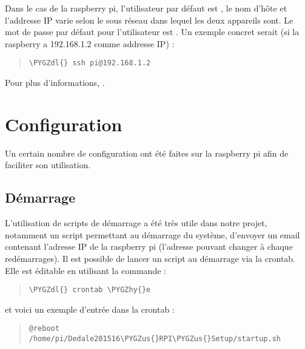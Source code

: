 \documentclass[letterpaper,10pt,french]{sphinxmanual}
\def\PYGZus{\char`\_}
\def\PYGZdl{\char`\$}
\def\PYGZhy{\char`\-}
\begin{document}
Dans le cas de la raspberry pi, l'utilisateur par défaut est , le nom d'hôte  et l'addresse IP
varie selon le sous réseau dans lequel les deux appareils sont. Le mot de passe par défaut pour l'utilisateur  est
. Un exemple concret serait (si la raspberry a 192.168.1.2 comme addresse IP) :
\begin{quote}

\begin{Verbatim}[commandchars=\\\{\}]
\PYGZdl{} ssh pi@192.168.1.2
\end{Verbatim}
\end{quote}

Pour plus d'informations, .


\section{Configuration}
\label{raspberrypi:configuration}
Un certain nombre de configuration ont été faites sur la raspberry pi afin de faciliter son utilisation.


\subsection{Démarrage}
\label{raspberrypi:demarrage}
L'utilisation de scripts de démarrage a été très utile dans notre projet, notamment un script permettant au démarrage
du système, d'envoyer un email contenant l'adresse IP de la raspberry pi (l'adresse pouvant changer à chaque redémarrages).
Il est possible de lancer un script au démarrage via la crontab. Elle est éditable en utilisant la commande :
\begin{quote}

\begin{Verbatim}[commandchars=\\\{\}]
\PYGZdl{} crontab \PYGZhy{}e
\end{Verbatim}
\end{quote}

et voici un exemple d'entrée dans la crontab :
\begin{quote}

\begin{Verbatim}[commandchars=\\\{\}]
@reboot /home/pi/Dedale201516\PYGZus{}RPI\PYGZus{}Setup/startup.sh
\end{Verbatim}
\end{quote}
\end{document}
